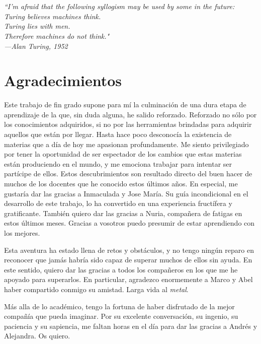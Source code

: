 \chapter*{}
\begin{flushright}
	\textit{``I'm afraid that the following syllogism may be used by some in the future:\\	Turing believes machines think.\\	Turing lies with men.\\	Therefore machines do not think."\\  —Alan Turing, 1952}
\end{flushright}

\chapter*{Agradecimientos}
Este trabajo de fin grado supone para mí la culminación de una dura etapa de aprendizaje de la que, sin duda alguna, he salido reforzado. Reforzado no sólo por los conocimientos adquiridos, si no por las herramientas brindadas para adquirir aquellos que están por llegar. Hasta hace poco desconocía la existencia de materias que a día de hoy me apasionan profundamente. Me siento privilegiado por tener la oportunidad de ser espectador de los cambios que estas materias están produciendo en el mundo, y me emociona trabajar para intentar ser partícipe de ellos. Estos descubrimientos son resultado directo del buen hacer de muchos de los docentes que he conocido estos últimos años. En especial, me gustaría dar las gracias a Inmaculada y Jose María. Su guía incondicional en el desarrollo de este trabajo, lo ha convertido en una experiencia fructífera y gratificante. También quiero dar las gracias a Nuria, compañera de fatigas en estos últimos meses. Gracias a vosotros puedo presumir de estar aprendiendo con los mejores.

Esta aventura ha estado llena de retos y obstáculos, y no tengo ningún reparo en reconocer que jamás habría sido capaz de superar muchos de ellos sin ayuda. En este sentido, quiero dar las gracias a todos los compañeros en los que me he apoyado para superarlos. En particular, agradezco enormemente a Marco y Abel haber compartido conmigo su amistad. Larga vida al \emph{metal}. 

Más alla de lo académico, tengo la fortuna de haber disfrutado de la mejor compañía que pueda imaginar. Por su excelente conversación, su ingenio, su paciencia y su sapiencia, me faltan horas en el día para dar las gracias a Andrés y Alejandra. Os quiero.

